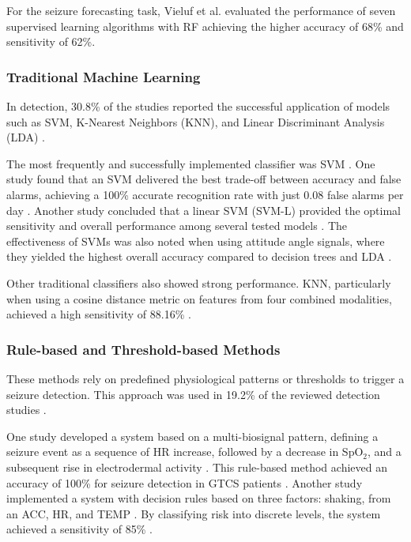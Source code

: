 For the seizure forecasting task, Vieluf et al. \cite{Vieluf2023-zv} evaluated the performance of seven supervised learning algorithms with RF achieving the higher accuracy of 68\% and sensitivity of 62\%.


\subsubsection{Traditional Machine Learning}
In detection, 30.8\% of the studies reported the successful application of models such as SVM, K-Nearest Neighbors (KNN), and Linear Discriminant Analysis (LDA) \cite{Milosevic2016-ee, Hamlin2021-sd, Poh2012-af, Ge2023-ab, Li2022-ty, Xu2022-tx, Wang2025-my, De_Cooman2018-pq}.

The most frequently and successfully implemented classifier was SVM \cite{Milosevic2016-ee, De_Cooman2018-pq, Poh2012-af, Ge2023-ab, Li2022-ty, Xu2022-tx, Wang2025-my}. One study found that an SVM delivered the best trade-off between accuracy and false alarms, achieving a 100\% accurate recognition rate with just 0.08 false alarms per day \cite{Xu2022-tx}. Another study concluded that a linear SVM (SVM-L) provided the optimal sensitivity and overall performance among several tested models \cite{Wang2025-my}. The effectiveness of SVMs was also noted when using attitude angle signals, where they yielded the highest overall accuracy compared to decision trees and LDA \cite{Wang2025-ql}.

Other traditional classifiers also showed strong performance. KNN, particularly when using a cosine distance metric on features from four combined modalities, achieved a high sensitivity of 88.16\% \cite{Ge2023-ab}.


\subsubsection{Rule-based and Threshold-based Methods}
These methods rely on predefined physiological patterns or thresholds to trigger a seizure detection. This approach was used in 19.2\% of the reviewed detection studies \cite{Cogan2017-lg, Ali2020-ke, Hegarty-Craver2021-hk, Gheryani2017-yg, Arends2018-ew}.

One study developed a system based on a multi-biosignal pattern, defining a seizure event as a sequence of HR increase, followed by a decrease in SpO$_2$, and a subsequent rise in electrodermal activity \cite{Cogan2017-lg}. This rule-based method achieved an accuracy of 100\% for seizure detection in GTCS patients \cite{Cogan2017-lg}. Another study implemented a system with decision rules based on three factors: shaking, from an ACC, HR, and TEMP \cite{Ali2020-ke}. By classifying risk into discrete levels, the system achieved a sensitivity of 85\% \cite{Ali2020-ke}. 

